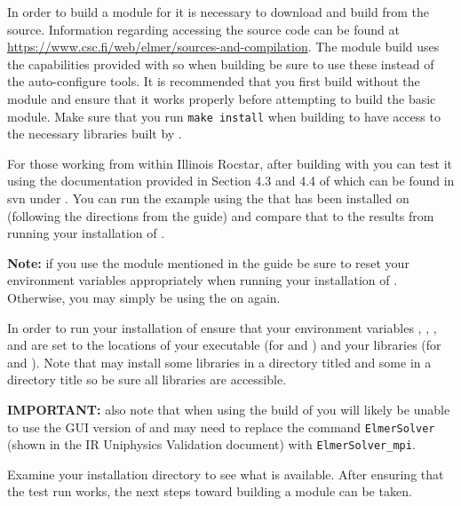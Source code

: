 
In order to build a module for \elmer it is necessary to download and build \elmer from the source. Information regarding accessing the source code can be found at \url{https://www.csc.fi/web/elmer/sources-and-compilation}. The module build uses the  capabilities provided with \elmer so when building \elmer be sure to use these instead of the auto-configure tools. It is recommended that you first build \elmer without the module and ensure that it works properly before attempting to build the basic module. Make sure that you run \texttt{make install} when building \elmer to have access to the necessary libraries built by \elmer\!\!.

For those working from within Illinois Rocstar, after building \elmer with  you can test it using the documentation provided in Section 4.3 and 4.4 of  which can be found in svn under . You can run the example using the \elmer that has been installed on  (following the directions from the guide) and compare that to the results from running your installation of \elmer\!\!. 

\textbf{Note:} if you use the \elmer module mentioned in the guide be sure to reset your environment variables appropriately when running your installation of \elmer\!\!. Otherwise, you may simply be using the \elmer on  again. 

In order to run your installation of \elmer ensure that your environment variables , , , and  are set to the locations of your \elmer executable (for  and ) and your \elmer libraries (for  and ). Note that \elmer may install some libraries in a directory titled  and some in a directory title  so be sure all libraries are accessible. 

\textbf{IMPORTANT:} also note that when using the  build of \elmer  you will likely be unable to use the GUI version of \elmer and may need to replace the command \texttt{ElmerSolver} (shown in the IR Uniphysics Validation document) with \texttt{ElmerSolver\_mpi}. 

Examine your \elmer installation directory to see what is available. After ensuring that the test run works, the next steps toward building a module can be taken.

